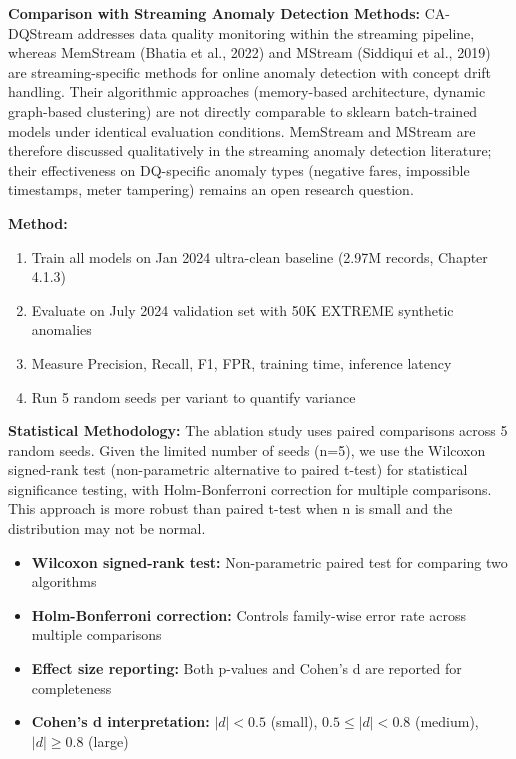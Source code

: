 \textbf{Comparison with Streaming Anomaly Detection Methods:} CA-DQStream addresses data quality monitoring within the streaming pipeline, whereas MemStream (Bhatia et al., 2022) and MStream (Siddiqui et al., 2019) are streaming-specific methods for online anomaly detection with concept drift handling. Their algorithmic approaches (memory-based architecture, dynamic graph-based clustering) are not directly comparable to sklearn batch-trained models under identical evaluation conditions. MemStream and MStream are therefore discussed qualitatively in the streaming anomaly detection literature; their effectiveness on DQ-specific anomaly types (negative fares, impossible timestamps, meter tampering) remains an open research question.

\textbf{Method:}
\begin{enumerate}
    \item Train all models on Jan 2024 ultra-clean baseline (2.97M records, Chapter 4.1.3)
    \item Evaluate on July 2024 validation set with 50K EXTREME synthetic anomalies
    \item Measure Precision, Recall, F1, FPR, training time, inference latency
    \item Run 5 random seeds per variant to quantify variance
\end{enumerate}

\textbf{Statistical Methodology:} The ablation study uses paired comparisons across 5 random seeds. Given the limited number of seeds (n=5), we use the Wilcoxon signed-rank test (non-parametric alternative to paired t-test) for statistical significance testing, with Holm-Bonferroni correction for multiple comparisons. This approach is more robust than paired t-test when n is small and the distribution may not be normal.

\begin{itemize}
    \item \textbf{Wilcoxon signed-rank test:} Non-parametric paired test for comparing two algorithms
    \item \textbf{Holm-Bonferroni correction:} Controls family-wise error rate across multiple comparisons
    \item \textbf{Effect size reporting:} Both p-values and Cohen's d are reported for completeness
    \item \textbf{Cohen's d interpretation:} $|d| < 0.5$ (small), $0.5 \leq |d| < 0.8$ (medium), $|d| \geq 0.8$ (large)
\end{itemize}

